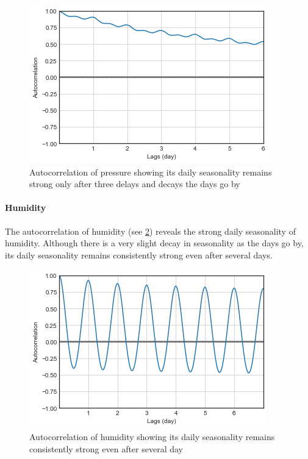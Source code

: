 \begin{figure}
  \includegraphics[width=\linewidth]
  {figures/figure_autocorr_pressure.png}
  \caption{ Autocorrelation of pressure showing its daily seasonality remains strong only after three delays and decays the days go by}
  \label{figure_autocorr_pressure}
\end{figure}


\paragraph{Humidity}
The autocorrelation of humidity (see \ref{figure_autocorr_humidity}) reveals the strong daily seasonality of humidity. Although there is a very slight decay in seasonality as the days go by, its daily seasonality remains consistently strong even after several days.

\begin{figure}
  \includegraphics[width=\linewidth]
  {figures/figure_autocorr_humidity.png}
  \caption{ Autocorrelation of humidity showing its daily seasonality remains consistently strong even after several day}
  \label{figure_autocorr_humidity}
\end{figure}


